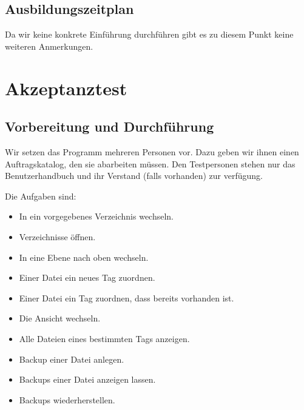 \documentclass[10pt,paper=a4,final]{scrartcl}
\begin{document}
\subsection{Ausbildungszeitplan}
Da wir keine konkrete Einführung durchführen gibt es zu diesem Punkt keine weiteren Anmerkungen.
\section{Akzeptanztest}
\subsection{Vorbereitung und Durchf\"uhrung}
Wir setzen das Programm mehreren Personen vor. Dazu geben wir ihnen einen Auftragskatalog, den sie abarbeiten müssen. Den Testpersonen stehen nur das Benutzerhandbuch und ihr Verstand (falls vorhanden) zur verfügung.

Die Aufgaben sind:
\begin{itemize}
  \item In ein vorgegebenes Verzeichnis wechseln.
  \item Verzeichnisse öffnen.
  \item In eine Ebene nach oben wechseln.
  \item Einer Datei ein neues Tag zuordnen.
  \item Einer Datei ein Tag zuordnen, dass bereits vorhanden ist.
  \item Die Ansicht wechseln.
  \item Alle Dateien eines bestimmten Tags anzeigen.
  \item Backup einer Datei anlegen.
  \item Backups einer Datei anzeigen lassen.
  \item Backups wiederherstellen.
\end{itemize}
\end{document}
